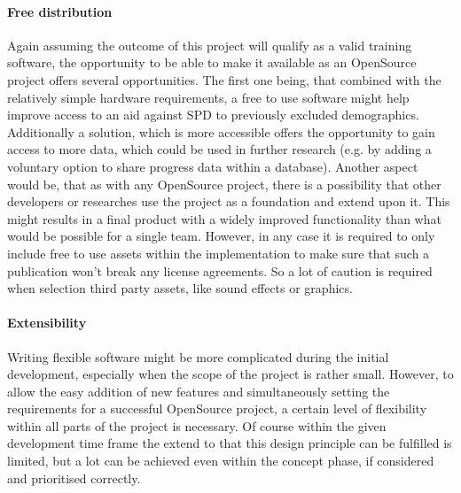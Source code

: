 \documentclass[a4paper,11pt]{article}%
\renewcommand{\\}{\vspace*{0.5\baselineskip} \newline}
\begin{document}
\paragraph{Free distribution} Again assuming the outcome of this project will qualify as a valid training software, the opportunity to be able to make it available as an OpenSource project offers several opportunities. The first one being, that combined with the relatively simple hardware requirements, a free to use software might help improve access to an aid against \ac{SPD} to previously excluded demographics. Additionally a solution, which is more accessible offers the opportunity to gain access to more data, which could be used in further research (e.g. by adding a voluntary option to share progress data within a database). Another aspect would be, that as with any OpenSource project, there is a possibility that other developers or researches use the project as a foundation and extend upon it. This might results in a final product with a widely improved functionality than what would be possible for a single team. However, in any case it is required to only include free to use assets within the implementation to make sure that such a publication won't break any license agreements. So a lot of caution is required when selection third party assets, like sound effects or graphics.


\paragraph{Extensibility} Writing flexible software might be more complicated during the initial development, especially when the scope of the project is rather small. However, to allow the easy addition of new features and simultaneously setting the requirements for a successful OpenSource project, a certain level of flexibility within all parts of the project is necessary. Of course within the given development time frame the extend to that this design principle can be fulfilled is limited, but a lot can be achieved even within the concept phase, if considered and prioritised correctly.
\end{document}
